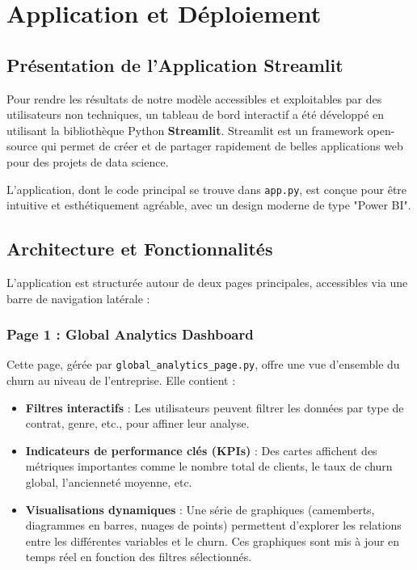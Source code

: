 \chapter{Application et Déploiement}
\minitoc

\section{Présentation de l'Application Streamlit}
Pour rendre les résultats de notre modèle accessibles et exploitables par des utilisateurs non techniques, un tableau de bord interactif a été développé en utilisant la bibliothèque Python \textbf{Streamlit}. Streamlit est un framework open-source qui permet de créer et de partager rapidement de belles applications web pour des projets de data science.

L'application, dont le code principal se trouve dans \texttt{app.py}, est conçue pour être intuitive et esthétiquement agréable, avec un design moderne de type "Power BI".

\section{Architecture et Fonctionnalités}
L'application est structurée autour de deux pages principales, accessibles via une barre de navigation latérale :

\subsection{Page 1 : Global Analytics Dashboard}
Cette page, gérée par \texttt{global\_analytics\_page.py}, offre une vue d'ensemble du churn au niveau de l'entreprise. Elle contient :
\begin{itemize}
    \item \textbf{Filtres interactifs} : Les utilisateurs peuvent filtrer les données par type de contrat, genre, etc., pour affiner leur analyse.
    \item \textbf{Indicateurs de performance clés (KPIs)} : Des cartes affichent des métriques importantes comme le nombre total de clients, le taux de churn global, l'ancienneté moyenne, etc.
    \item \textbf{Visualisations dynamiques} : Une série de graphiques (camemberts, diagrammes en barres, nuages de points) permettent d'explorer les relations entre les différentes variables et le churn. Ces graphiques sont mis à jour en temps réel en fonction des filtres sélectionnés.
\end{itemize}

